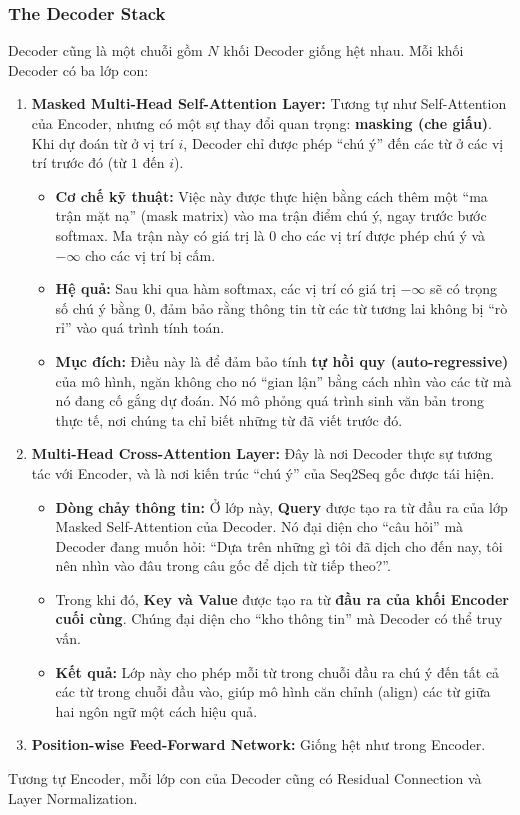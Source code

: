 \subsubsection{The Decoder Stack}
Decoder cũng là một chuỗi gồm $N$ khối Decoder giống hệt nhau. Mỗi khối Decoder có ba lớp con:
\begin{enumerate}
    \item \textbf{Masked Multi-Head Self-Attention Layer:} Tương tự như Self-Attention của Encoder, nhưng có một sự thay đổi quan trọng: \textbf{masking (che giấu)}. Khi dự đoán từ ở vị trí $i$, Decoder chỉ được phép “chú ý” đến các từ ở các vị trí trước đó (từ $1$ đến $i$).
    \begin{itemize}
        \item \textbf{Cơ chế kỹ thuật:} Việc này được thực hiện bằng cách thêm một “ma trận mặt nạ” (mask matrix) vào ma trận điểm chú ý, ngay trước bước softmax. Ma trận này có giá trị là 0 cho các vị trí được phép chú ý và $-\infty$ cho các vị trí bị cấm.
        \item \textbf{Hệ quả:} Sau khi qua hàm softmax, các vị trí có giá trị $-\infty$ sẽ có trọng số chú ý bằng 0, đảm bảo rằng thông tin từ các từ tương lai không bị “rò rỉ” vào quá trình tính toán.
        \item \textbf{Mục đích:} Điều này là để đảm bảo tính \textbf{tự hồi quy (auto-regressive)} của mô hình, ngăn không cho nó “gian lận” bằng cách nhìn vào các từ mà nó đang cố gắng dự đoán. Nó mô phỏng quá trình sinh văn bản trong thực tế, nơi chúng ta chỉ biết những từ đã viết trước đó.
    \end{itemize}
    \item \textbf{Multi-Head Cross-Attention Layer:} Đây là nơi Decoder thực sự tương tác với Encoder, và là nơi kiến trúc “chú ý” của Seq2Seq gốc được tái hiện.
    \begin{itemize}
        \item \textbf{Dòng chảy thông tin:} Ở lớp này, \textbf{Query} được tạo ra từ đầu ra của lớp Masked Self-Attention của Decoder. Nó đại diện cho “câu hỏi” mà Decoder đang muốn hỏi: “Dựa trên những gì tôi đã dịch cho đến nay, tôi nên nhìn vào đâu trong câu gốc để dịch từ tiếp theo?”.
        \item Trong khi đó, \textbf{Key và Value} được tạo ra từ \textbf{đầu ra của khối Encoder cuối cùng}. Chúng đại diện cho “kho thông tin” mà Decoder có thể truy vấn.
        \item \textbf{Kết quả:} Lớp này cho phép mỗi từ trong chuỗi đầu ra chú ý đến tất cả các từ trong chuỗi đầu vào, giúp mô hình căn chỉnh (align) các từ giữa hai ngôn ngữ một cách hiệu quả.
    \end{itemize}
    \item \textbf{Position-wise Feed-Forward Network:} Giống hệt như trong Encoder.
\end{enumerate}
Tương tự Encoder, mỗi lớp con của Decoder cũng có Residual Connection và Layer Normalization.

